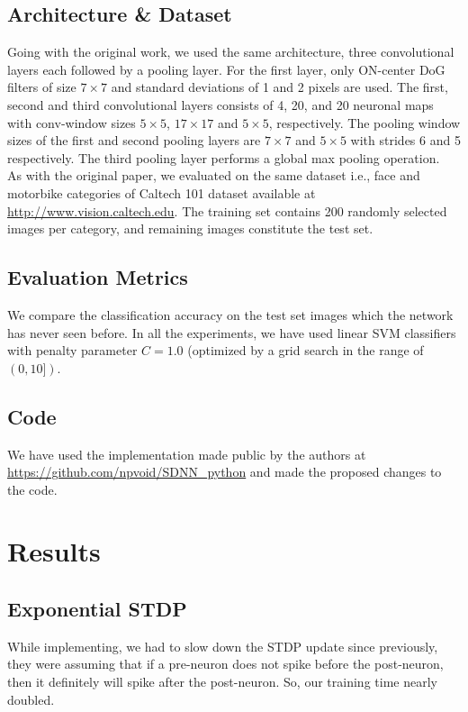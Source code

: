 \documentclass[conference]{IEEEtran}
\begin{document}
\subsection{Architecture \& Dataset}
Going with the original work, we used the same architecture, three convolutional layers each followed by a pooling layer. For the first layer, only ON-center DoG filters of size $7 \times 7$ and standard deviations of 1 and 2 pixels are used. The first, second and third convolutional layers consists of 4, 20, and 20 neuronal maps with conv-window sizes $5 \times 5$, $ 17 \times 17 $ and $ 5 \times 5 $, respectively. The pooling window sizes of the first and second pooling layers are $ 7 \times 7 $ and $ 5 \times 5 $ with strides 6 and 5 respectively. The third pooling layer performs a global max pooling operation. \\
As with the original paper, we evaluated on the same dataset i.e., face and motorbike categories of Caltech 101 dataset available at \url{http://www.vision.caltech.edu}. The training set contains 200 randomly selected images per category, and remaining images constitute the test set. 

\subsection{Evaluation Metrics}
We compare the classification accuracy on the test set images which the network has never seen before. In all the experiments, we have used linear SVM classifiers with penalty parameter $C = 1.0$ (optimized by a grid search in the range of $(0, 10])$.

\subsection{Code}
We have used the implementation made public by the authors at \url{https://github.com/npvoid/SDNN\_python} and made the proposed changes to the code. 

\section{Results}
\subsection{Exponential STDP}
While implementing, we had to slow down the STDP update since previously, they were assuming that if a pre-neuron does not spike before the post-neuron, then it definitely will spike after the post-neuron. So, our training time nearly doubled. 
\end{document}
